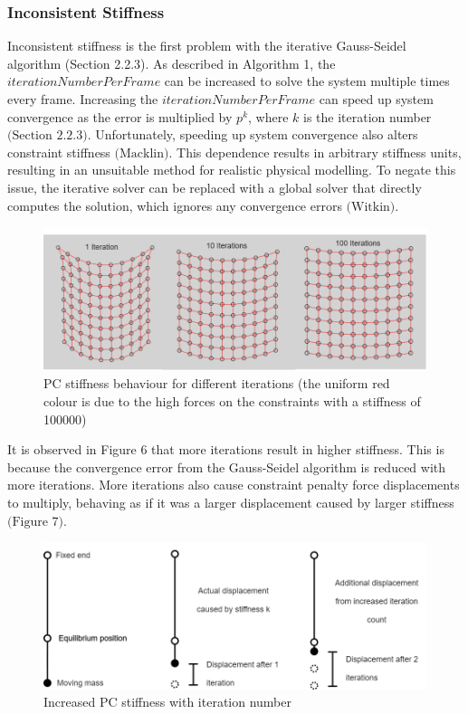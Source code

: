 \documentclass[12pt, letterpaper]{article}
\begin{document}
\subsubsection{Inconsistent Stiffness}
\hspace{\parindent} Inconsistent stiffness is the first problem with the iterative Gauss-Seidel algorithm (Section 2.2.3). As described in Algorithm 1, the $iterationNumberPerFrame$ can be increased to solve the system multiple times every frame. Increasing the $iterationNumberPerFrame$ can speed up system convergence as the error is multiplied by $p^k$, where $k$ is the iteration number $\text{(Section 2.2.3)}$. Unfortunately, speeding up system convergence also alters constraint stiffness $\text{(Macklin)}$. This dependence results in arbitrary stiffness units, resulting in an unsuitable method for realistic physical modelling. To negate this issue, the iterative solver can be replaced with a global solver that directly computes the solution, which ignores any convergence errors $\text{(Witkin)}$.
\begin{figure}[H]
\centering
\includegraphics[width=14cm]{pc stiffness.png}
\caption{PC stiffness behaviour for different iterations (the uniform red colour is due to the high forces on the constraints with a stiffness of 100000)}
\label{fig:figure}
\end{figure} 
It is observed in Figure 6 that more iterations result in higher stiffness. This is because the convergence error from the Gauss-Seidel algorithm is reduced with more iterations. More iterations also cause constraint penalty force displacements to multiply, behaving as if it was a larger displacement caused by larger stiffness $\text{(Figure 7)}$.
\begin{figure}[H]
\centering
\includegraphics[width=15cm]{pc stiffness exp 1.png}
\caption{Increased PC stiffness with iteration number}
\label{fig:figure}
\end{figure} 
\end{document}
